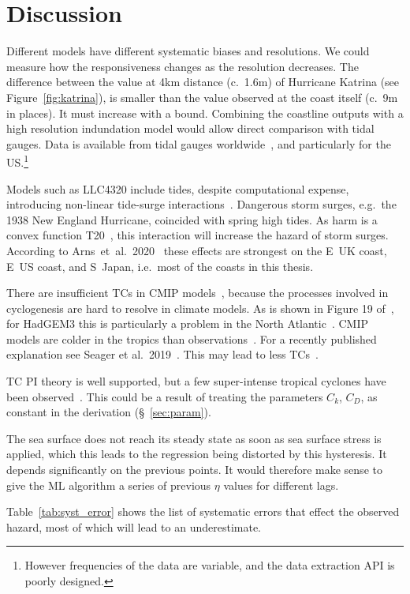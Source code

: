 \section{Discussion}
\label{sec:7_Discussion}

\label{sec:future}

Different models have different systematic biases
and resolutions. We could measure how
the responsiveness changes as the resolution decreases. The difference
between the value at 4km distance (c.~1.6m) of Hurricane Katrina (see Figure~\ref{fig:katrina}),
is smaller than the value observed at the coast itself (c.~9m in places).
It must increase with a bound.
Combining the coastline outputs with a high resolution indundation model
would allow direct comparison with tidal gauges.
Data is available from tidal gauges worldwide~\cite{tadesse2020data, arns2020non},
and particularly for the US.\footnote{
However frequencies of the data are variable,
and the data extraction API is poorly designed.}

Models such as LLC4320 include tides,
 despite computational expense,
introducing non-linear tide-surge interactions~\cite{feng2019characteristics,
arns2020non}.
Dangerous storm surges, e.g.~the 1938 New England
Hurricane, coincided with spring high tides.
As harm is a convex function T20~\cite{taleb2019statistical},
this interaction will increase the hazard of storm surges.
According to Arns~et~al.~2020~\cite{arns2020non}
these effects are strongest on the E~UK coast,
E~US coast, and S~Japan, i.e.~most of the coasts in
this thesis.

There are insufficient TCs in CMIP models~\cite{camargo2013global},
because the processes involved
in cyclogenesis are hard to resolve in climate models.
As is shown in Figure 19 of~\cite{williams2018met},
 for HadGEM3 this is particularly a problem in the North Atlantic~\cite{tomassini2017interaction}. %
CMIP models are colder in the tropics than observations~\cite{camargo2013global}.
For a recently published explanation see Seager et al.~2019~\cite{seager2019strengthening}.
This may lead to less TCs~\cite{tomassini2017interaction}.

TC PI theory is well supported,
but a few super-intense tropical cyclones have been observed~\cite{camargo2019tropical}.
This could be a result of treating the parameters $C_k$, $C_D$, as constant in the derivation (§~\ref{sec:param}).

The sea surface does not reach its steady state as soon as sea surface
stress is applied, which this leads
to the regression being distorted by this hysteresis.
It depends significantly on the previous points.
It would therefore make sense to give the ML algorithm
a series of previous $\eta$ values for different lags.


\label{sec:sys-errors}
Table~\ref{tab:syst_error} shows the list of systematic errors that effect the
observed hazard, most of which will lead to an underestimate.


